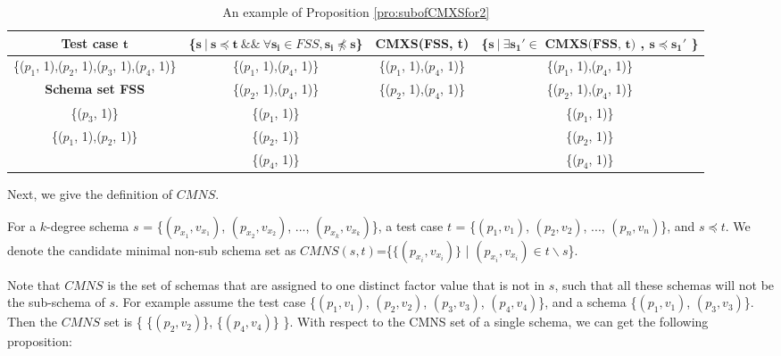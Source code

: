 \begin{table}[ht]
  \centering
  \setlength{\tabcolsep}{2pt}
  \caption{An example of Proposition \ref{pro:subofCMXSfor2}}
  {\footnotesize
    \begin{tabular}{|c|c|c|c|}
    \hline
  \textbf{  Test case $\textbf{t}$} & \textbf{ \{$\textbf{s}\ |\ \textbf{s} \preceq \textbf{t}\ \&\&\ \forall \textbf{s}_{\textbf{i}} \in FSS, \textbf{s}_{\textbf{i}} \npreceq \textbf{s}$\} }& \textbf{  CMXS(FSS, t)} & \textbf{\{$ \textbf{s}\ |\ \exists \textbf{s}_{\textbf{1}}' \in \textbf{ CMXS(FSS, t)} $ , $\textbf{s} \preceq \textbf{s}_{\textbf{1}}'$ \}}\\\hline
    \{($p_{1}$, 1),($p_{2}$, 1),($p_{3}$, 1),($p_{4}$, 1)\}  & \{($p_{1}$, 1),($p_{4}$, 1)\} & \{($p_{1}$, 1),($p_{4}$, 1)\} & \{($p_{1}$, 1),($p_{4}$, 1)\}\\ \cline{1-1}
      \textbf{Schema set FSS}  & \{($p_{2}$, 1),($p_{4}$, 1)\} &  \{($p_{2}$, 1),($p_{4}$, 1)\} & \{($p_{2}$, 1),($p_{4}$, 1)\} \\\cline{1-1}
     \{($p_{3}$, 1)\}         & \{($p_{1}$, 1)\}&  &\{($p_{1}$, 1)\}\\
     \{($p_{1}$, 1),($p_{2}$, 1)\}  &       \{($p_{2}$, 1)\} &  &\{($p_{2}$, 1)\}\\
          &       \{($p_{4}$, 1)\} &  & \{($p_{4}$, 1)\}\\\hline
    \end{tabular}}%
  \label{examleOfCMXSPro2}%
\end{table}%
%
%


Next, we give the definition of $CMNS$.

\begin{definition}
For a $k$-degree schema $s$ = \{$(p_{x_{1}}, v_{x_{1}})$, $(p_{x_{2}}, v_{x_{2}})$, ..., $(p_{x_{k}}, v_{x_{k}})$\}, a test case $t$ = \{$(p_{1}, v_{1})$, $(p_{2}, v_{2})$, ..., $(p_{n}, v_{n})$\}, and $s \preceq t$. We denote the candidate minimal non-sub schema set as $CMNS(s,t)$=\{$\{(p_{x_{i}}, v_{x_{i}})\}$ | $(p_{x_{i}}, v_{x_{i}}) \in t \backslash s $\}.
\end{definition}

Note that $CMNS$ is the set of schemas that are assigned to one distinct factor value that is not in $s$, such that all these schemas will not be the sub-schema of $s$. For example assume the test case \{$(p_{1}, v_{1})$, $(p_{2}, v_{2})$, $(p_{3}, v_{3})$, $(p_{4}, v_{4})$\}, and a schema \{$(p_{1}, v_{1})$, $(p_{3}, v_{3})$\}. Then the $CMNS$ set is \{ \{$(p_{2}, v_{2})$\}, \{$(p_{4}, v_{4})$\} \}.  With respect to the CMNS set of a single schema, we can get the following proposition:

